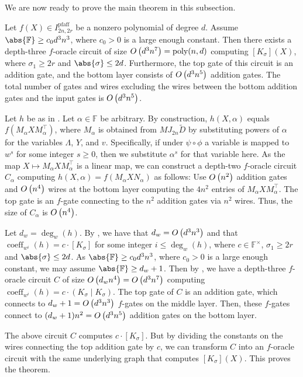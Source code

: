 \documentclass[10pt,a4paper]{amsart}
\DeclareMathOperator{\pfaff}{pfaff}
\DeclareMathOperator{\poly}{poly}
\DeclareMathOperator{\coeff}{coeff}
\newcommand*\F{\mathbb{F}}
\newcommand*\bigO[1]{%
    O\kern-0.0pt\left(#1\right)
}
\begin{document}
We are now ready to prove the main theorem in this subsection.

\begin{thrm}\label{thrm:bipfaffian_canonical_extraction}
    Let $f(X) \in I^{\pfaff}_{2n, 2r}$ be a nonzero polynomial of degree $d$.
    Assume $\abs{\F} \geq c_0 d^3 n^3$, where $c_0>0$ is a large enough constant.
    Then there exists a depth-three $f$-oracle circuit of size $\bigO{d^3 n^7} = \poly(n, d)$ computing $[K_\sigma](X)$, where $\sigma_1\geq 2r$ and $\abs{\sigma} \leq 2d$.
    Furthermore, the top gate of this circuit is an addition gate, and the bottom layer consists of $\bigO{d^3 n^5}$ addition gates.
    The total number of gates and wires excluding the wires between the bottom addition gates and the input gates is $\bigO{d^3 n^5}$.
\end{thrm}
\begin{pf}
Let $h$ be as in .
Let $\alpha \in \F$ be arbitrary.
By construction, $h(X,\alpha)$ equals $f(M_\alpha X M_\alpha^{\top})$, where $M_\alpha$ is obtained from $M J_{2n} \widetilde{D}$ by substituting powers of $\alpha$ for the variables $\Lambda$, $Y$, and $v$.
Specifically, if under $\psi \circ \phi$ a variable is mapped to $w^s$ for some integer $s \geq 0$, then we substitute $\alpha^s$ for that variable here.
As the map $X\mapsto M_\alpha X M_\alpha^{\top}$ is a linear map, we can construct a depth-two $f$-oracle circuit $C_\alpha$ computing $h(X,\alpha) = f(M_\alpha X N_\alpha)$ as follows:
Use $\bigO{n^2}$ addition gates and $\bigO{n^4}$ wires at the bottom layer computing the $4n^2$ entries of $M_\alpha X M_\alpha^{\top}$.
The top gate is an $f$-gate connecting to the $n^2$ addition gates via $n^2$ wires.
Thus, the size of $C_\alpha$ is $\bigO{n^4}$.

Let $d_w=\deg_w(h)$.
By , we have that $d_w = \bigO{d^3 n^3}$ and that $\coeff_{w^i}(h) = c\cdot [K_\sigma]$ for some integer $i \leq \deg_w(h)$, where $c\in\F^\times$, $\sigma_1\geq 2r$ and $\abs{\sigma}\leq 2d$.
As $\abs{\F} \geq c_0 d^3n^3$, where $c_0>0$ is a large enough constant, we may assume $\abs{\F} \geq d_w+1$.
Then by , we have a depth-three $f$-oracle circuit $C$ of size $\bigO{d_w n^4} = \bigO{d^3 n^7}$ computing $\coeff_{w^i}(h)=c\cdot (K_\sigma\mid K_\sigma)$.
The top gate of $C$ is an addition gate, which connects to $d_w+1 = \bigO{d^3 n^3}$ $f$-gates on the middle layer.
Then, these $f$-gates connect to $(d_w+1)n^2 = \bigO{d^3 n^5}$ addition gates on the bottom layer.

The above circuit $C$ computes $c\cdot [K_\sigma]$.
But by dividing the constants on the wires connecting the top addition gate by $c$, we can transform $C$ into an $f$-oracle circuit with the same underlying graph that computes $[K_\sigma](X)$.
This proves the theorem.
\end{pf}
\end{document}
